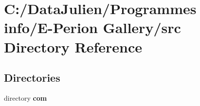 \section{C\-:/\-Data\-Julien/\-Programmes info/\-E-\/\-Perion Gallery/src Directory Reference}
\label{dir_68267d1309a1af8e8297ef4c3efbcdba}
\subsection*{Directories}
\begin{DoxyCompactItemize}
\item 
directory {\bf com}
\end{DoxyCompactItemize}

